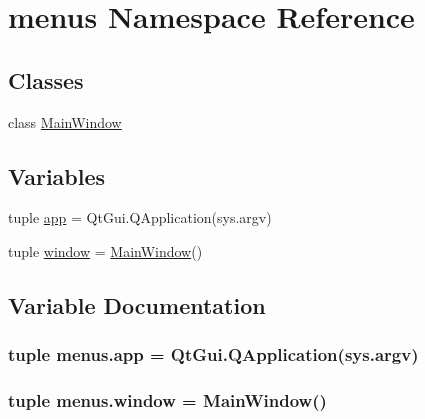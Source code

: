 \hypertarget{namespacemenus}{}\section{menus Namespace Reference}
\label{namespacemenus}
\subsection*{Classes}
\begin{DoxyCompactItemize}
\item 
class \hyperlink{classmenus_1_1MainWindow}{Main\+Window}
\end{DoxyCompactItemize}
\subsection*{Variables}
\begin{DoxyCompactItemize}
\item 
tuple \hyperlink{namespacemenus_af6179a5b9301fb3a2705ce905e1dedeb}{app} = Qt\+Gui.\+Q\+Application(sys.\+argv)
\item 
tuple \hyperlink{namespacemenus_aa87ce06150a481f244a954138d597d7d}{window} = \hyperlink{classmenus_1_1MainWindow}{Main\+Window}()
\end{DoxyCompactItemize}


\subsection{Variable Documentation}
\hypertarget{namespacemenus_af6179a5b9301fb3a2705ce905e1dedeb}{}
\subsubsection[{app}]{\setlength{\rightskip}{0pt plus 5cm}tuple menus.\+app = Qt\+Gui.\+Q\+Application(sys.\+argv)}\label{namespacemenus_af6179a5b9301fb3a2705ce905e1dedeb}
\hypertarget{namespacemenus_aa87ce06150a481f244a954138d597d7d}{}
\subsubsection[{window}]{\setlength{\rightskip}{0pt plus 5cm}tuple menus.\+window = {\bf Main\+Window}()}\label{namespacemenus_aa87ce06150a481f244a954138d597d7d}
